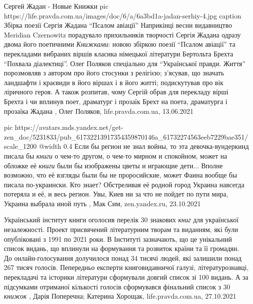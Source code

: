Сергей Жадан - Новые Книжки
\ifcmt
  pic https://life.pravda.com.ua/images/doc/6/a/6a3bd1a-jadan-serhiy-4.jpg
	caption Збірка поезії Сергія Жадана \enquote{Псалом авіації}
\fi
Наприкінці весни видавництво Meridian Czernowitz порадувало прихильників
творчості Сергія Жадана одразу двома його поетичними \emph{Книжками}: новою збіркою
поезії \enquote{Псалом авіації} та перекладами вибраних віршів класика німецької
літератури Бертольта Брехта \enquote{Похвала діалектиці}.  Олег Поляков спеціально для
\enquote{Української правди. Життя} порозмовляв з автором про його стосунки з релігією;
з'ясував, що значать ландшафти і краєвиди в його віршах і в його житті;
подискутував про вік ліричного героя. А також розпитав, чому Сергій обрав для
перекладу вірші Брехта і чи вплинув поет, драматург і прозаїк Брехт на поета,
драматурга і прозаїка Жадана
, 
Олег Поляков, life.pravda.com.ua, 13.06.2021

\ifcmt
  pic https://avatars.mds.yandex.net/get-zen_doc/5231833/pub_61732213917354359870146a_61732274563eeb7229bae351/scale_1200
  @width 0.4
\fi
Если бы регион не знал войны, то эта девочка-вундеркинд писала бы \emph{книги}
о чем-то другом, о чем-то мирном и спокойном, может на обложке её \emph{книги}
были бы изображены цветы и играющие дети...  Вполне возможно, что её взгляды
были бы не проросийские, может Фаина вообще бы писала по-украински. Кто знает?
Обстреливая её родной город Украина навсегда потеряла и её, и весь регион.
Увы, Киев ни за что не пойдет по пути мира, Украина выбрала иной путь
, Мак Сим, zen.yandex.ru, 23.10.2021

Український інститут книги оголосив перелік 30 знакових \emph{книг} для української
незалежності.  Проект присвячений літературним творам та виданням, які були
опубліковані з 1991 по 2021 роки.  В Інституті зазначають, що це унікальний
список видань, що вплинули на формування та розвиток країни та її громадян.  До
онлайн-голосування долучилося понад 34 тисячі людей, які залишили понад 267
тисяч голосів.  Пепередньо експерти книговидавничої галузі, літературознавці,
перекладачі та історики літератури сформували довгий список зі 100 видань.  А
за підсумками отриманої кількості голосів сформувався фінальний список з 30
\emph{книжок}
, 
Дарія Поперечна; Катерина Хорощак, life.pravda.com.ua, 27.10.2021
